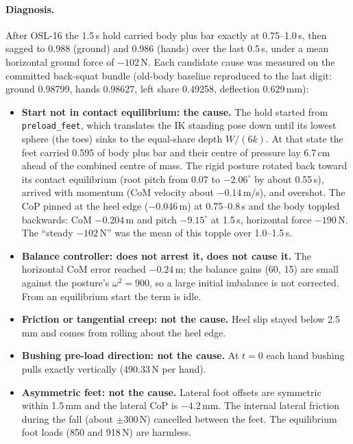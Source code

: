\documentclass[11pt,a4paper]{article}
\begin{document}
\paragraph{Diagnosis.} After OSL-16 the 1.5\,s hold carried body plus bar
exactly at 0.75--1.0\,s, then sagged to 0.988 (ground) and 0.986 (hands)
over the last 0.5\,s, under a mean horizontal ground force of $-102$\,N.
Each candidate cause was measured on the committed back-squat bundle
(old-body baseline reproduced to the last digit: ground 0.98799, hands
0.98627, left share 0.49258, deflection 0.629\,mm):
\begin{itemize}[nosep]
\item \textbf{Start not in contact equilibrium: the cause.} The hold
  started from \texttt{preload\_feet}, which translates the IK standing
  pose down until its lowest sphere (the toes) sinks to the equal-share
  depth $W/(6k)$. At that state the feet carried 0.595 of body plus bar
  and their centre of pressure lay 6.7\,cm ahead of the combined centre of
  mass. The rigid posture rotated back toward its contact equilibrium
  (root pitch from 0.07 to $-2.06^\circ$ by about 0.55\,s), arrived with
  momentum (CoM velocity about $-0.14$\,m/s), and overshot. The CoP pinned
  at the heel edge ($-0.046$\,m) at 0.75--0.8\,s and the body toppled
  backwards: CoM $-0.204$\,m and pitch $-9.15^\circ$ at 1.5\,s, horizontal
  force $-190$\,N. The ``steady $-102$\,N'' was the mean of this topple
  over 1.0--1.5\,s.
\item \textbf{Balance controller: does not arrest it, does not cause it.}
  The horizontal CoM error reached $-0.24$\,m; the balance gains (60, 15)
  are small against the posture's $\omega^2=900$, so a large initial
  imbalance is not corrected. From an equilibrium start the term is idle.
\item \textbf{Friction or tangential creep: not the cause.} Heel slip
  stayed below 2.5\,mm and comes from rolling about the heel edge.
\item \textbf{Bushing pre-load direction: not the cause.} At $t=0$ each
  hand bushing pulls exactly vertically (490.33\,N per hand).
\item \textbf{Asymmetric feet: not the cause.} Lateral foot offsets are
  symmetric within 1.5\,mm and the lateral CoP is $-4.2$\,mm. The internal
  lateral friction during the fall (about $\pm300$\,N) cancelled between
  the feet. The equilibrium foot loads (850 and 918\,N) are harmless.
\end{itemize}
\end{document}
